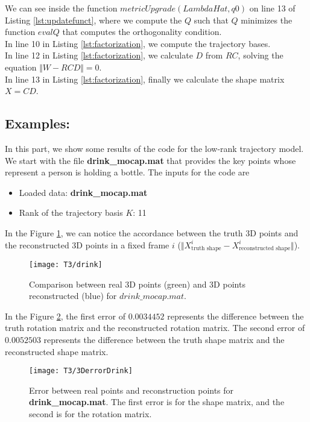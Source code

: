 \noindent We can see inside the function $metricUpgrade(LambdaHat,q0)$ on line 13 of Listing \ref{lst:updatefunct}, where we compute the $Q$ such that $Q$ minimizes the function $evalQ$ that computes the orthogonality condition.\\ 
\noindent In line 10 in Listing \ref{lst:factorization}, we compute the trajectory bases.\\
\noindent In line 12 in Listing \ref{lst:factorization}, we calculate $D$ from $RC$, solving the equation $\Vert W-RCD\Vert =0$.\\
\noindent In line 13 in Listing \ref{lst:factorization}, finally we calculate the shape matrix $X=CD$.\\
\subsection{Examples:}
\noindent In this part, we show some results of the code for the low-rank trajectory model.\\ 

\noindent We start with the file \textbf{drink\_mocap.mat} that provides the key points whose represent a person is holding a bottle. The inputs for the code are
\begin{itemize}
\item Loaded data: \textbf{drink\_mocap.mat} 
\item Rank of the trajectory basis $K$: 11 
\end{itemize}

\noindent In the Figure \ref{fig:drink}, we can notice the accordance between the truth 3D points and the reconstructed 3D points in a fixed frame $i$ ($\Vert X_{\text{truth shape}}^{i}-X_{\text{reconstructed shape}}^{i}\Vert$).\\
\begin{figure}[h]  
	\centering
	\texttt{[image: T3/drink]}
	\caption{Comparison between real 3D points (green) and 3D points reconstructed (blue) for \textbf{$drink\_mocap.mat$}.}
	\label{fig:drink}
\end{figure}

\noindent In the Figure \ref{fig:drink_error}, the first error of $0.0034452$ represents the difference between the truth rotation matrix and the reconstructed rotation matrix. The second error of $0.0052503$ represents the difference between the truth shape matrix and the reconstructed shape matrix. 
\begin{figure}[h]
	\centering
	\texttt{[image: T3/3DerrorDrink]}
	\caption{Error between real points and reconstruction points for \textbf{drink\_mocap.mat}. The first error is for the shape matrix, and the second is for the rotation matrix.}
	\label{fig:drink_error}
\end{figure}
\noindent 